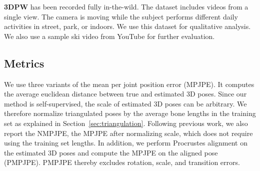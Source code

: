 \documentclass[10pt,twocolumn,letterpaper]{article}
\begin{document}
\textbf{3DPW} \cite{vonMarcard2018} has been recorded fully in-the-wild. The dataset includes videos from a single view. The camera is moving while the subject performs different daily activities in street, park, or indoors. We use this dataset for qualitative analysis. We also use a sample ski video from YouTube for further evaluation. 



\subsection{Metrics}
We use three variants of the mean per joint position error (MPJPE). It computes the average euclidean distance between true and estimated 3D poses. Since our method is self-supervised, the scale of estimated 3D poses can be arbitrary. We therefore normalize triangulated poses by the average bone lengths in the training set as explained in Section~\ref{sec:triangulation}. 
Following previous work, we also report the NMPJPE, the MPJPE after normalizing scale, which does not require using the training set lengths.
In addition, we perform Procrustes alignment on the estimated 3D poses and compute the MPJPE on the aligned pose (PMPJPE). PMPJPE thereby excludes rotation, scale, and transition errors.
\end{document}
